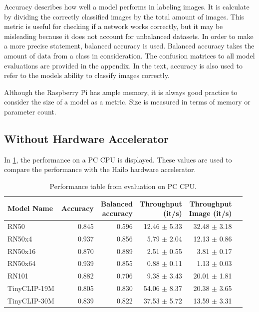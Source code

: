 Accuracy describes how well a model performs in labeling images.
It is calculate by dividing the correctly classified images by the total amount of images.
This metric is useful for checking if a network works correctly, but it may be misleading because it does not account for unbalanced datasets.
In order to make a more precise statement, balanced accuracy is used.
Balanced accuracy takes the amount of data from a class in consideration.
The confusion matrices to all model evaluations are provided in the appendix.
In the text, accuracy is also used to refer to the models ability to classify images correctly.

Although the Raspberry Pi has ample memory, it is always good practice to consider the size of a model as a metric. Size is measured in terms of memory or parameter count.

\subsection{Without Hardware Accelerator}
In \cref{methods:tab:perfPC}, the performance on a PC CPU is displayed. These values are used to compare the performance with the Hailo hardware accelerator.

\begin{table}[tbp]
    \centering
    \begin{tabular}{l|rrrrr}
    \hline
        Model Name & Accuracy & \makecell{Balanced \\accuracy}&\makecell{Throughput\\(it/s)} & \makecell{Throughput \\ Image (it/s)} \\ \hline
        RN50 & 0.845& 0.596& 12.46 $\pm$ 5.33& 32.48 $\pm$ 3.18 \\ 
        RN50x4 & 0.937& 0.856& 5.79 $\pm$ 2.04& 12.13 $\pm$ 0.86 \\ 
        RN50x16 & 0.870& 0.889& 2.51 $\pm$ 0.55& 3.81 $\pm$ 0.17 \\ 
        RN50x64 & 0.939& 0.855& 0.88 $\pm$ 0.11& 1.13 $\pm$ 0.03\\
        RN101 & 0.882& 0.706& 9.38 $\pm$ 3.43& 20.01 $\pm$ 1.81\\  
        TinyCLIP-19M & 0.805& 0.830&54.06 $\pm$ 8.37& 20.38 $\pm$ 3.65 \\ 
        TinyCLIP-30M & 0.839& 0.822&37.53 $\pm$ 5.72& 13.59 $\pm$ 3.31 \\ 
    \end{tabular}
    \caption{Performance table from evaluation on PC CPU.}
    \label{methods:tab:perfPC}
\end{table}

